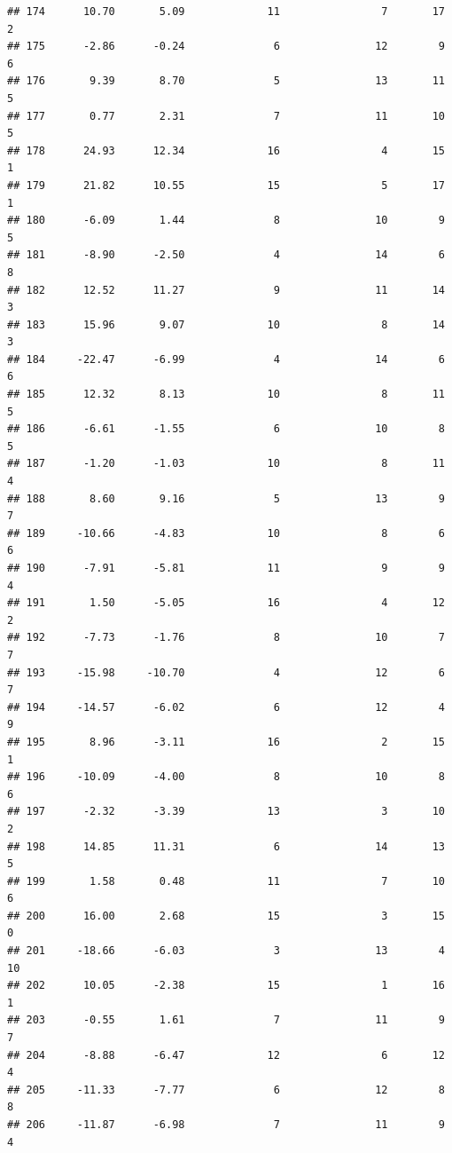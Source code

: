 \documentclass[]{book}
\begin{document}
\begin{verbatim}
## 174      10.70       5.09             11                7       17          2
## 175      -2.86      -0.24              6               12        9          6
## 176       9.39       8.70              5               13       11          5
## 177       0.77       2.31              7               11       10          5
## 178      24.93      12.34             16                4       15          1
## 179      21.82      10.55             15                5       17          1
## 180      -6.09       1.44              8               10        9          5
## 181      -8.90      -2.50              4               14        6          8
## 182      12.52      11.27              9               11       14          3
## 183      15.96       9.07             10                8       14          3
## 184     -22.47      -6.99              4               14        6          6
## 185      12.32       8.13             10                8       11          5
## 186      -6.61      -1.55              6               10        8          5
## 187      -1.20      -1.03             10                8       11          4
## 188       8.60       9.16              5               13        9          7
## 189     -10.66      -4.83             10                8        6          6
## 190      -7.91      -5.81             11                9        9          4
## 191       1.50      -5.05             16                4       12          2
## 192      -7.73      -1.76              8               10        7          7
## 193     -15.98     -10.70              4               12        6          7
## 194     -14.57      -6.02              6               12        4          9
## 195       8.96      -3.11             16                2       15          1
## 196     -10.09      -4.00              8               10        8          6
## 197      -2.32      -3.39             13                3       10          2
## 198      14.85      11.31              6               14       13          5
## 199       1.58       0.48             11                7       10          6
## 200      16.00       2.68             15                3       15          0
## 201     -18.66      -6.03              3               13        4         10
## 202      10.05      -2.38             15                1       16          1
## 203      -0.55       1.61              7               11        9          7
## 204      -8.88      -6.47             12                6       12          4
## 205     -11.33      -7.77              6               12        8          8
## 206     -11.87      -6.98              7               11        9          4

\end{verbatim}
\end{document}
